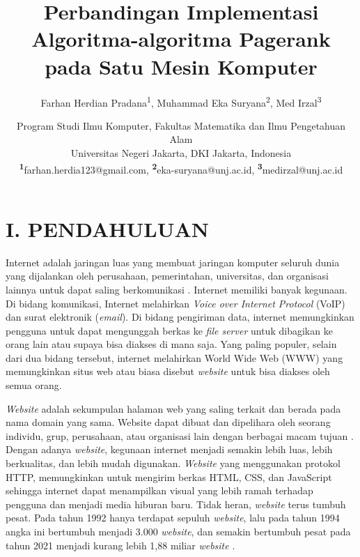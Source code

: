 \documentclass[
	a4paper, %
	12pt, %
	unnumberedsections, %
	twoside, %
]{LTJournalArticle}
\title{Perbandingan Implementasi Algoritma-algoritma Pagerank pada Satu Mesin Komputer} %
\author{%
	Farhan Herdian Pradana\textsuperscript{1}, Muhammad Eka Suryana\textsuperscript{2}, Med Irzal\textsuperscript{3}
}
\date{
	\footnotesize
	Program Studi Ilmu Komputer, Fakultas Matematika dan Ilmu Pengetahuan Alam \\
	Universitas Negeri Jakarta, DKI Jakarta, Indonesia \\
	\textsuperscript{\textbf{1}}farhan.herdia123@gmail.com, 
	\textsuperscript{\textbf{2}}eka-suryana@unj.ac.id, 
	\textsuperscript{\textbf{3}}medirzal@unj.ac.id
}
\begin{document}
\maketitle %


\section{I. PENDAHULUAN}

Internet adalah jaringan luas yang membuat jaringan komputer seluruh dunia yang dijalankan oleh perusahaan, pemerintahan, universitas, dan organisasi lainnya untuk dapat saling berkomunikasi \citep{sample2018internet}. Internet memiliki banyak kegunaan. Di bidang komunikasi, Internet melahirkan \textit{Voice over Internet Protocol} (VoIP) dan surat elektronik (\textit{email}). Di bidang pengiriman data, internet memungkinkan pengguna untuk dapat mengunggah berkas ke \textit{file server} untuk dibagikan ke orang lain atau supaya bisa diakses di mana saja. Yang paling populer, selain dari dua bidang tersebut, internet melahirkan World Wide Web (WWW) yang memungkinkan situs web atau biasa disebut \textit{website} untuk bisa diakses oleh semua orang.

\textit{Website} adalah sekumpulan halaman web yang saling terkait dan berada pada nama domain yang sama. Website dapat dibuat dan dipelihara oleh seorang individu, grup, perusahaan, atau organisasi lain dengan berbagai macam tujuan \citep{techopedia2020website}. Dengan adanya \textit{website}, kegunaan internet menjadi semakin lebih luas, lebih berkualitas, dan lebih mudah digunakan. \textit{Website} yang menggunakan protokol HTTP, memungkinkan untuk mengirim berkas HTML, CSS, dan JavaScript sehingga internet dapat menampilkan visual yang lebih ramah terhadap pengguna dan menjadi media hiburan baru. Tidak heran, \textit{website} terus tumbuh pesat. Pada tahun 1992 hanya terdapat sepuluh \textit{website}, lalu pada tahun 1994 angka ini bertumbuh menjadi 3.000 \textit{website}, dan semakin bertumbuh pesat pada tahun 2021 menjadi kurang lebih 1,88 miliar \textit{website} \citep{amstrong2021website}.
\end{document}
